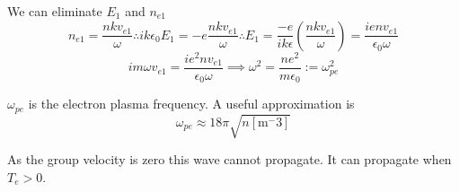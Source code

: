 We can eliminate $E_1$ and $n_{e1}$
\begin{equation}
	n_{e1} = \frac{nkv_{e1}}{\omega} \therefore ik\epsilon_0 E_1 = -e \frac{nkv_{e1}}{\omega} \therefore E_1 = \frac{-e}{ik\epsilon}\left(\frac{nkv_{e1}}{\omega}\right)=\frac{ienv_{e1}}{\epsilon_0 \omega}
\end{equation}
\begin{equation}
	im\omega v_{e1} = \frac{ie^2nv_{e1}}{\epsilon_0 \omega} \implies \omega^2 = \frac{ne^2}{m\epsilon_0} := \omega_{pe}^2
\end{equation}

$\omega_{pe}$ is the electron plasma frequency. A useful approximation is
\begin{equation}
	\omega_{pe} \approx 18\pi\sqrt{n[\text{m}^-3]}
\end{equation}

As the group velocity is zero this wave cannot propagate. It can propagate when $T_e>0$.
